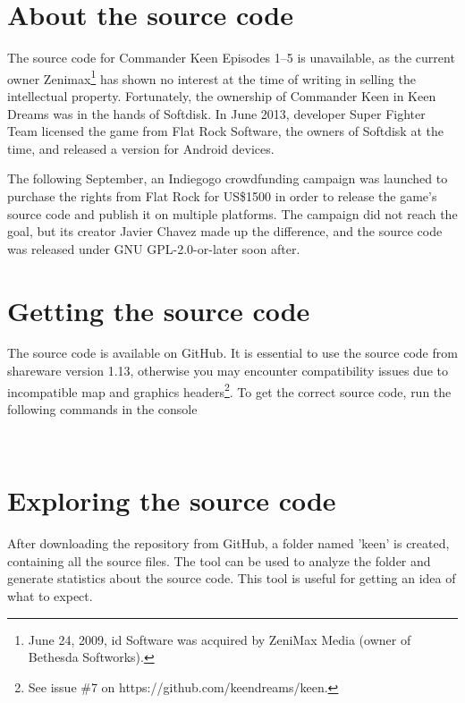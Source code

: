 \documentclass[book.tex]{subfiles}
\begin{document}
\label{chapter_software_architecture}
\section{About the source code}
The source code for Commander Keen Episodes 1--5 is unavailable, as the current owner Zenimax\footnote{June 24, 2009, id Software was acquired by ZeniMax Media (owner of Bethesda Softworks).} has shown no interest at the time of writing in selling the intellectual property. Fortunately, the ownership of Commander Keen in Keen Dreams was in the hands of Softdisk. In June 2013, developer Super Fighter Team licensed the game from Flat Rock Software, the owners of Softdisk at the time, and released a version for Android devices.\\

\par
The following September, an Indiegogo crowdfunding campaign was launched to purchase the rights from Flat Rock for US\$1500 in order to release the game's source code and publish it on multiple platforms. The campaign did not reach the goal, but its creator Javier Chavez made up the difference, and the source code was released under GNU GPL-2.0-or-later soon after.


\section{Getting the source code}
\label{section:source_code}
The source code is available on GitHub. It is essential to use the source code from shareware version 1.13, otherwise you may encounter compatibility issues due to incompatible map and graphics headers\footnote{See issue \#7 on https://github.com/keendreams/keen.}. To get the correct source code, run the following commands in the console \\

\par
{}\\

\section{Exploring the source code}
After downloading the repository from GitHub, a folder named 'keen' is created, containing all the source files. The  tool can be used to analyze the folder and generate statistics about the source code. This tool is useful for getting an idea of what to expect.\\
\end{document}
